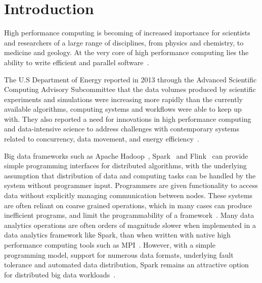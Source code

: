 \documentclass{uit-report}
\begin{document}
\chapter{Introduction}






High performance computing is becoming of increased importance for scientists and researchers of a large range of disciplines, from physics and chemistry, to medicine and geology. At the very core of high performance computing lies the ability to write efficient and parallel software~\cite{engineering}.

The U.S Department of Energy reported in 2013 through the Advanced Scientific Computing Advisory Subcommittee that the data volumes produced by scientific experiments and simulations were increasing more rapidly than the currently available algorithms, computing systems and workflows were able to keep up with. They also reported a need for innovations in high performance computing and data-intensive science to address challenges with contemporary systems related to concurrency, data movement, and energy efficiency~\cite{subcommittee}.

Big data frameworks such as Apache Hadoop~\cite{hadoop}, Spark~\cite{spark} and Flink~\cite{flink} can provide simple programming interfaces for distributed algorithms, with the underlying assumption that distribution of data and computing tasks can be handled by the system without programmer input. Programmers are given functionality to access data without explicitly managing communication between nodes. These systems are often reliant on coarse grained operations, which in many cases can produce inefficient programs, and limit the programmability of a framework~\cite{husky}\cite{piccolo}. Many data analytics operations are often orders of magnitude slower when implemented in a data analytics framework like Spark, than when written with native high performance computing tools such as MPI~\cite{bridgingthegap}. However, with a simple programming model, support for numerous data formats, underlying fault tolerance and automated data distribution, Spark remains an attractive option for distributed big data workloads~\cite{sparkarticle}. 
\end{document}
